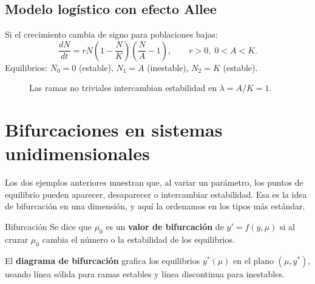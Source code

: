 \documentclass[11pt,letterpaper]{article}
\begin{document}
\subsection{Modelo logístico con efecto Allee}

Si el crecimiento cambia de signo para poblaciones bajas:
\[
\frac{dN}{dt}=rN\!\left(1-\frac{N}{K}\right)\!\left(\frac{N}{A}-1\right),
\qquad r>0,\; 0<A<K.
\]
Equilibrios: $N_0=0$ (estable), $N_1=A$ (inestable), $N_2=K$ (estable).

\begin{figure}[H]
\centering
{}
\caption{Las ramas no triviales intercambian estabilidad en $\lambda=A/K=1$.}
\end{figure}

\section{Bifurcaciones en sistemas unidimensionales}
\label{sec:bifurcaciones-unidim}

Los dos ejemplos anteriores muestran que, al variar un parámetro, los puntos de
equilibrio pueden aparecer, desaparecer o intercambiar estabilidad. Esa es la
idea de bifurcación en una dimensión, y aquí la ordenamos en los tipos más
estándar.

\begin{definicion}{Bifurcación}{}
Se dice que $\mu_0$ es un \textbf{valor de bifurcación} de $y'=f(y,\mu)$
si al cruzar $\mu_0$ cambia el número o la estabilidad de los equilibrios.
\end{definicion}

El \textbf{diagrama de bifurcación} grafica los equilibrios $y^*(\mu)$ en el
plano $(\mu,y^*)$, usando línea sólida para ramas estables y línea discontinua
para inestables.
\end{document}
